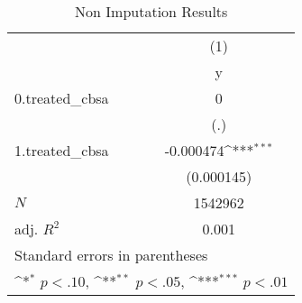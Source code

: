 \begin{table}[htbp]\centering
\def\sym#1{\ifmmode^{#1}\else\(^{#1}\)\fi}
\caption{Non Imputation Results}
\begin{tabular}{l*{1}{c}}
\hline\hline
            &\multicolumn{1}{c}{(1)}\\
            &\multicolumn{1}{c}{y}\\
\hline
0.treated\_cbsa&           0         \\
            &         (.)         \\
[1em]
1.treated\_cbsa&   -0.000474\sym{***}\\
            &  (0.000145)         \\
\hline
\(N\)       &     1542962         \\
adj. \(R^{2}\)&       0.001         \\
\hline\hline
\multicolumn{2}{l}{\footnotesize Standard errors in parentheses}\\
\multicolumn{2}{l}{\footnotesize \sym{*} \(p<.10\), \sym{**} \(p<.05\), \sym{***} \(p<.01\)}\\
\end{tabular}
\end{table}
